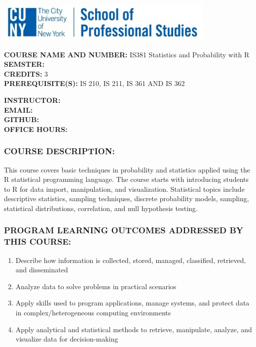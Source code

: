 \documentclass[
  letterpaper,
  DIV=11,
  numbers=noendperiod]{scrartcl}
\author{}
\date{}
\providecommand{\tightlist}{%
  \setlength{\itemsep}{0pt}\setlength{\parskip}{0pt}}\usepackage{longtable,booktabs,array}
\begin{document}
\begin{center}
\includegraphics[width=0.8\textwidth,height=\textheight]{../images/sps_logo.jpg}
\end{center}

\textbf{COURSE NAME AND NUMBER:} IS381 Statistics and Probability with
R\\
\textbf{SEMSTER:}\\
\textbf{CREDITS:} 3\\
\textbf{PREREQUISITE(S):} IS 210, IS 211, IS 361 AND IS 362

\textbf{INSTRUCTOR:}\\
\textbf{EMAIL:}\\
\textbf{GITHUB:}\\
\textbf{OFFICE HOURS:}

\subsubsection{COURSE DESCRIPTION:}\label{course-description}

This course covers basic techniques in probability and statistics
applied using the R statistical programming language. The course starts
with introducing students to R for data import, manipulation, and
visualization. Statistical topics include descriptive statistics,
sampling techniques, discrete probability models, sampling, statistical
distributions, correlation, and null hypothesis testing.

\subsubsection{PROGRAM LEARNING OUTCOMES ADDRESSED BY THIS
COURSE:}\label{program-learning-outcomes-addressed-by-this-course}

\begin{enumerate}
\def\labelenumi{\arabic{enumi}.}
\tightlist
\item
  Describe how information is collected, stored, managed, classified,
  retrieved, and disseminated\\
\item
  Analyze data to solve problems in practical scenarios
\item
  Apply skills used to program applications, manage systems, and protect
  data in complex/heterogeneous computing environments
\item
  Apply analytical and statistical methods to retrieve, manipulate,
  analyze, and visualize data for decision-making
\end{enumerate}
\end{document}
